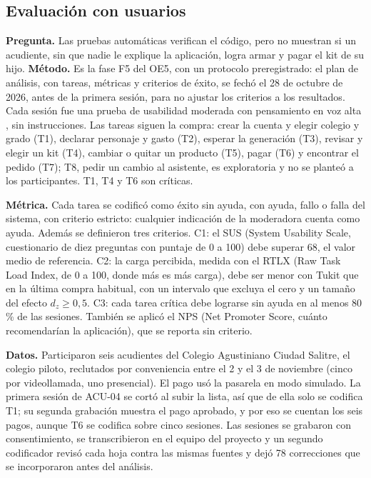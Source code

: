 \subsection{Evaluación con usuarios}
\label{sec:oe5}

\textbf{Pregunta.} Las pruebas automáticas verifican el código, pero no muestran si un acudiente, sin que
nadie le explique la aplicación, logra armar y pagar el kit de su hijo. \textbf{Método.} Es la fase F5 del OE5, con un protocolo
preregistrado: el plan de análisis, con tareas, métricas y criterios de éxito, se fechó el 28 de octubre de
2026, antes de la primera sesión, para no ajustar los criterios
a los resultados. Cada sesión fue una prueba de usabilidad moderada con pensamiento en voz alta
\citep{lazar_research_2017}, sin instrucciones. Las tareas siguen la compra: crear la cuenta y elegir colegio
y grado (T1), declarar personaje y gasto (T2), esperar la generación (T3), revisar y elegir un kit (T4),
cambiar o quitar un producto (T5), pagar (T6) y encontrar el pedido (T7); T8, pedir un cambio al asistente,
es exploratoria y no se planteó a los participantes. T1, T4 y T6 son críticas.

\textbf{Métrica.} Cada tarea se codificó como éxito sin ayuda, con ayuda, fallo o falla del sistema, con
criterio estricto: cualquier indicación de la moderadora cuenta como ayuda. Además se definieron tres
criterios. C1: el SUS (System Usability Scale, cuestionario de diez preguntas con puntaje de 0 a 100) debe
superar 68, el valor medio de referencia. C2: la carga percibida, medida con el RTLX (Raw Task Load Index, de
0 a 100, donde más es más carga), debe ser menor con Tukit que en la última compra habitual, con un intervalo
que excluya el cero y un tamaño del efecto $d_z \ge 0{,}5$. C3: cada tarea crítica debe lograrse sin ayuda en
al menos 80\,\% de las sesiones. También se aplicó el NPS (Net Promoter Score, cuánto recomendarían la
aplicación), que se reporta sin criterio.

\textbf{Datos.} Participaron seis acudientes del Colegio Agustiniano Ciudad Salitre, el colegio piloto,
reclutados por conveniencia entre el 2 y el 3 de noviembre (cinco por videollamada, uno presencial). El pago
usó la pasarela en modo simulado. La primera sesión de ACU-04 se cortó al subir la lista, así que de ella
solo se codifica T1; su segunda grabación muestra el pago aprobado, y por eso se cuentan los seis pagos,
aunque T6 se codifica sobre cinco sesiones. Las sesiones se grabaron con consentimiento, se transcribieron
en el equipo del proyecto y un segundo codificador revisó cada hoja contra las mismas fuentes y dejó 78
correcciones que se incorporaron antes del análisis.

